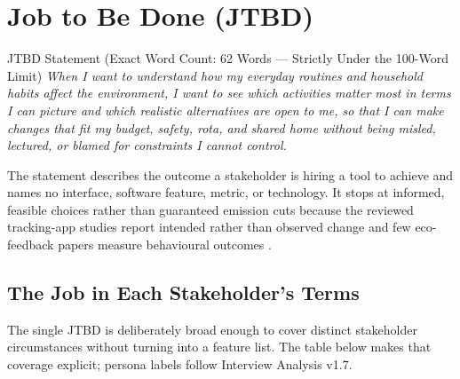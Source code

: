 \documentclass[12pt, a4paper]{article}
\begin{document}
\section{Job to Be Done (JTBD)}

\begin{jtbdbox}{JTBD Statement (Exact Word Count: 62 Words --- Strictly Under the 100-Word Limit)}
\textit{When I want to understand how my everyday routines and household habits affect the environment, I want to see which activities matter most in terms I can picture and which realistic alternatives are open to me, so that I can make changes that fit my budget, safety, rota, and shared home without being misled, lectured, or blamed for constraints I cannot control.}
\end{jtbdbox}

The statement describes the outcome a stakeholder is hiring a tool to achieve and names no interface, software feature, metric, or technology. It stops at informed, feasible choices rather than guaranteed emission cuts because the reviewed tracking-app studies report intended rather than observed change \cite{hoffmann2024,lasarov2024} and few eco-feedback papers measure behavioural outcomes \cite{froehlich2010}.

\subsection{The Job in Each Stakeholder's Terms}
The single JTBD is deliberately broad enough to cover distinct stakeholder circumstances without turning into a feature list. The table below makes that coverage explicit; persona labels follow Interview Analysis v1.7.
\end{document}
